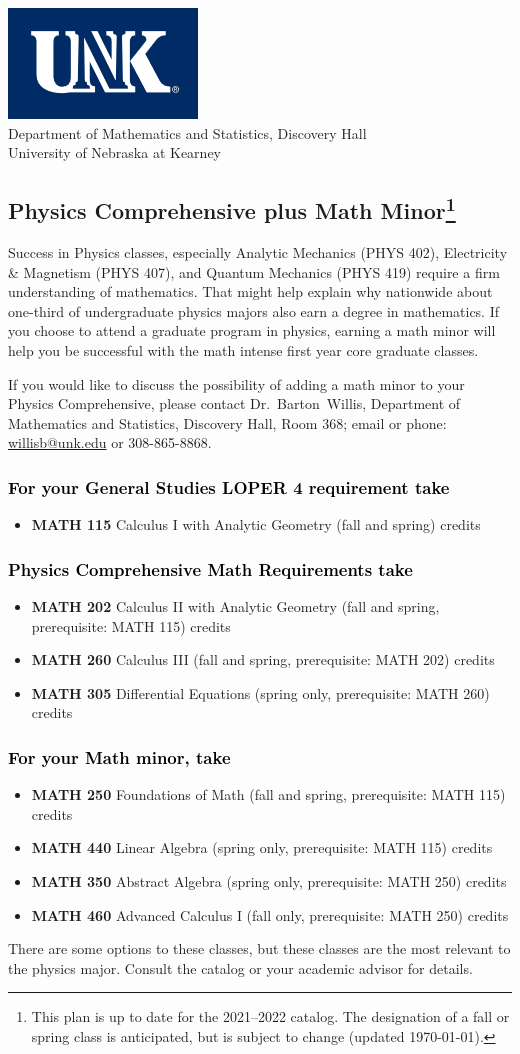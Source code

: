 \documentclass[10pt]{article}
\makeatletter
\newcommand{\calcone}{\textbf{MATH 115} Calculus I with Analytic Geometry (fall and spring) \dotfill 5 credits}
\newcommand{\calctwo}{\textbf{MATH 202} Calculus II with Analytic Geometry (fall and spring, prerequisite: MATH 115) \dotfill 5 credits }
\newcommand{\foundations}{\textbf{MATH 250} Foundations of Math (fall and spring, prerequisite: MATH 115)  \dotfill 3 credits}
\newcommand{\calcthree}{\textbf{MATH 260} Calculus III  (fall and spring, prerequisite: MATH 202) \dotfill 5 credits}
\newcommand{\linear}{\textbf{MATH 440} Linear Algebra (spring only, prerequisite: MATH 115) \dotfill 3 credits}
\newcommand{\diffeq}{\textbf{MATH 305}	Differential Equations (spring only, prerequisite: MATH 260) \dotfill 	3 credits}
\newcommand{\abstractalgebra}{\textbf{MATH 350}	Abstract Algebra (spring only, prerequisite: MATH 250) \dotfill 	3 credits}
\newcommand{\advancedcalc}{\textbf{MATH 460}	Advanced Calculus I  (fall only,   prerequisite: MATH 250) \dotfill 3 credits}
\newcommand{\contactbw}{\mbox{Dr.\ Barton Willis}, Department of Mathematics and Statistics,  Discovery Hall, Room 368;
email or phone: \href{mailto:willisb@unk.edu}{willisb@unk.edu} or 308-865-8868.}
\newcommand{\forinfo}[2]{If you would like to discuss the possibility of adding a math {#1} to your {#2}, please contact \contactbw}
\newcommand{\catalog}{2021--2022 }
\newcommand{\myfootnote}{\footnote{This plan is up to date for  the \catalog catalog. The designation of a fall or spring class is 
anticipated, but  is subject to change (updated  \today).}}
\newcommand{\myheading}{
\begin{flushleft}
\includegraphics[scale=0.35]{unk-logo}\\
\setcounter{footnote}{0}
\vspace{0.25in}
 \textcolor{unkblue}{Department of Mathematics and Statistics, Discovery Hall} \\
  \textcolor{unkblue}{University of Nebraska at Kearney}
\end{flushleft}}
\makeatother
\begin{document}
\newpage

\myheading


\subsection*{\textbf{\textcolor{unkblue}{Physics Comprehensive plus Math Minor\myfootnote}}}

\noindent Success in Physics classes, especially  Analytic Mechanics (PHYS 402), Electricity \& Magnetism (PHYS 407), and Quantum Mechanics (PHYS 419) require a firm understanding of mathematics. That might help explain why nationwide about one-third of undergraduate physics majors also earn a degree in mathematics. If you choose to attend a graduate program in physics, earning a math minor will help you be successful with the math intense first year core graduate classes.


\forinfo{minor}{Physics Comprehensive}

\subsubsection*{\textcolor{black}{For your General Studies LOPER 4 requirement take}}
\begin{itemize}
\item \calcone
\end{itemize}


\subsubsection*{\textcolor{black}{Physics Comprehensive Math Requirements take}}
\begin{itemize}
 \item \calctwo
 \item \calcthree
 \item \diffeq
\end{itemize}

\subsubsection*{\textcolor{black}{For your Math minor, take}}
\begin{itemize}
\item \foundations
\item \linear
\item \abstractalgebra
\item \advancedcalc
\end{itemize}
There are some options to these classes, but these classes are the most relevant to the physics major. Consult the catalog or your academic
advisor for details.
\end{document}
